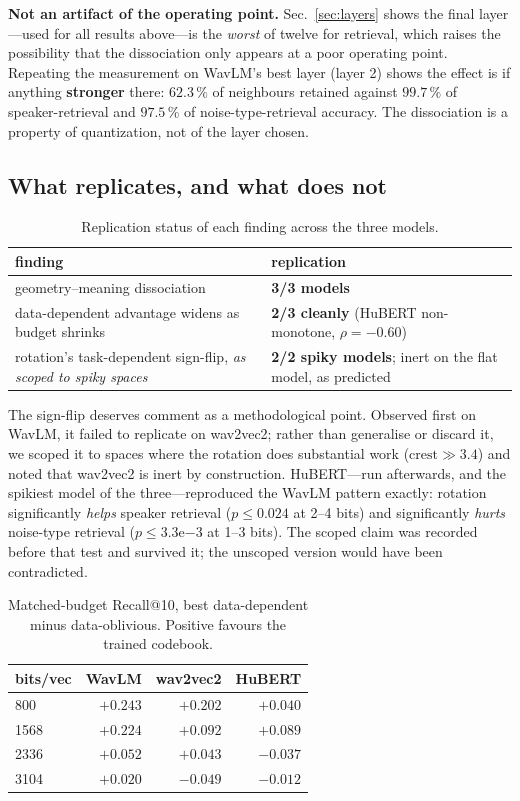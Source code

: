\documentclass[conference]{IEEEtran}
\begin{document}
\textbf{Not an artifact of the operating point.} Sec.~\ref{sec:layers} shows the final layer---used
for all results above---is the \emph{worst} of twelve for retrieval, which raises the possibility
that the dissociation only appears at a poor operating point. Repeating the measurement on WavLM's
best layer (layer 2) shows the effect is if anything \textbf{stronger} there: $62.3\,\%$ of
neighbours retained against $\mathbf{99.7\,\%}$ of speaker-retrieval and $97.5\,\%$ of
noise-type-retrieval accuracy. The dissociation is a property of quantization, not of the layer
chosen.

\subsection{What replicates, and what does not}
\label{sec:replication}

\begin{table}[t]
\centering
\caption{Replication status of each finding across the three models.}
\label{tab:replication}
\begin{tabular}{p{}p{}}
\toprule
finding & replication \\
\midrule
geometry--meaning dissociation & \textbf{3/3 models} \\
data-dependent advantage widens as budget shrinks & \textbf{2/3 cleanly} (HuBERT non-monotone, $\rho = -0.60$) \\
rotation's task-dependent sign-flip, \emph{as scoped to spiky spaces} & \textbf{2/2 spiky models}; inert on the flat model, as predicted \\
\bottomrule
\end{tabular}
\end{table}

The sign-flip deserves comment as a methodological point. Observed first on WavLM, it failed to
replicate on wav2vec2; rather than generalise or discard it, we scoped it to spaces where the
rotation does substantial work ($\mathrm{crest} \gg 3.4$) and noted that wav2vec2 is inert by
construction. HuBERT---run afterwards, and the spikiest model of the three---reproduced the WavLM
pattern exactly: rotation significantly \emph{helps} speaker retrieval ($p \le 0.024$ at 2--4 bits)
and significantly \emph{hurts} noise-type retrieval ($p \le 3.3\mathrm{e}{-3}$ at 1--3 bits). The
scoped claim was recorded before that test and survived it; the unscoped version would have been
contradicted.

\begin{table}[t]
\centering
\caption{Matched-budget Recall@10, best data-dependent minus data-oblivious. Positive favours the
trained codebook.}
\label{tab:rq1}
\begin{tabular}{lrrr}
\toprule
bits/vec & WavLM & wav2vec2 & HuBERT \\
\midrule
800 & $+0.243$ & $+0.202$ & $+0.040$ \\
1568 & $+0.224$ & $+0.092$ & $+0.089$ \\
2336 & $+0.052$ & $+0.043$ & $-0.037$ \\
3104 & $+0.020$ & $-0.049$ & $-0.012$ \\
\bottomrule
\end{tabular}
\end{table}
\end{document}
